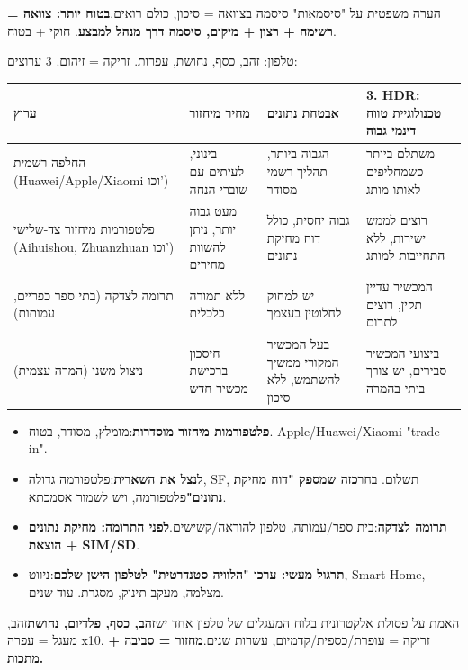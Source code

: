 \begin{tcbwarn}{הערה משפטית על "סיסמאות"}
סיסמה בצוואה = סיכון, כולם רואים.\textbf{בטוח יותר: צוואה = רשימה + רצון + מיקום, סיסמה דרך מנהל למבצע}. חוקי + בטוח.

\end{tcbwarn}


טלפון: זהב, כסף, נחושת, עפרות. זריקה = זיהום. 3 ערוצים:

\begin{center}
\begin{tabularx}{\linewidth}{|X|X|X|X|}
\hline
\textbf{ערוץ} & \textbf{מחיר מיחזור} & \textbf{אבטחת נתונים} & \textbf{3. HDR: טכנולוגיית טווח דינמי גבוה} \tabularnewline
\hline
החלפה רשמית (Huawei/Apple/Xiaomi וכו') & בינוני, לעיתים עם שוברי הנחה & הגבוה ביותר, תהליך רשמי מסודר & משתלם ביותר כשמחליפים לאותו מותג \tabularnewline
פלטפורמות מיחזור צד-שלישי (Aihuishou, Zhuanzhuan וכו') & מעט גבוה יותר, ניתן להשוות מחירים & גבוה יחסית, כולל דוח מחיקת נתונים & רוצים לממש ישירות, ללא התחייבות למותג \tabularnewline
תרומה לצדקה (בתי ספר כפריים, עמותות) & ללא תמורה כלכלית & יש למחוק לחלוטין בעצמך & המכשיר עדיין תקין, רוצים לתרום \tabularnewline
ניצול משני (המרה עצמית) & חיסכון ברכישת מכשיר חדש & בעל המכשיר המקורי ממשיך להשתמש, ללא סיכון & ביצועי המכשיר סבירים, יש צורך ביתי בהמרה \tabularnewline
\hline
\end{tabularx}
\end{center}

\begin{itemize}
  \item \textbf{פלטפורמות מיחזור מוסדרות}:מומלץ, מסודר, בטוח. Apple/Huawei/Xiaomi "trade-in".
  \item \textbf{לנצל את השארית}:פלטפורמה גדולה, SF, תשלום. בחר\textbf{כזה שמספק "דוח מחיקת נתונים"}פלטפורמה, ויש לשמור אסמכתא.
  \item \textbf{תרומה לצדקה}:בית ספר/עמותה, טלפון להוראה/קשישים.\textbf{לפני התרומה: מחיקת נתונים + הוצאת SIM/SD}.
  \item \textbf{תרגול מעשי: ערכו "הלוויה סטנדרטית" לטלפון הישן שלכם}:ניווט, Smart Home, מצלמה, מעקב תינוק, מסגרת. עוד שנים.
\end{itemize}

\begin{tcbinfo}{האמת על פסולת אלקטרונית}
בלוח המעגלים של טלפון אחד יש\textbf{זהב, כסף, פלדיום, נחושת}זהב, מעגל = עפרה x10. זריקה = עופרת/כספית/קדמיום, עשרות שנים.\textbf{מחזור = סביבה + מתכות.}

\end{tcbinfo}

